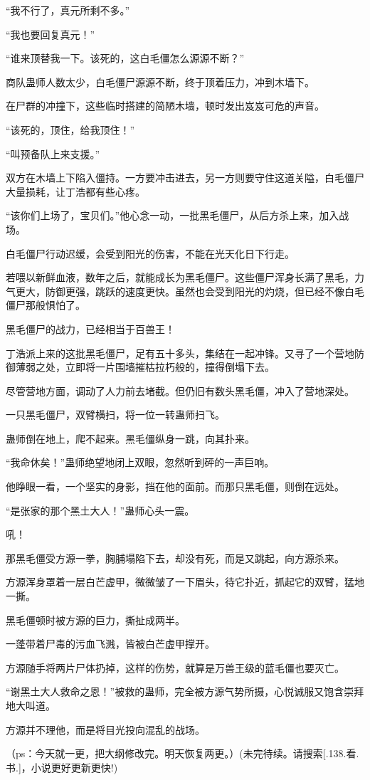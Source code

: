 \begin{this_body}
“我不行了，真元所剩不多。”

“我也要回复真元！”

“谁来顶替我一下。该死的，这白毛僵怎么源源不断？”

商队蛊师人数太少，白毛僵尸源源不断，终于顶着压力，冲到木墙下。

在尸群的冲撞下，这些临时搭建的简陋木墙，顿时发出岌岌可危的声音。

“该死的，顶住，给我顶住！”

“叫预备队上来支援。”

双方在木墙上下陷入僵持。一方要冲击进去，另一方则要守住这道关隘，白毛僵尸大量损耗，让丁浩都有些心疼。

“该你们上场了，宝贝们。”他心念一动，一批黑毛僵尸，从后方杀上来，加入战场。

白毛僵尸行动迟缓，会受到阳光的伤害，不能在光天化日下行走。

若喂以新鲜血液，数年之后，就能成长为黑毛僵尸。这些僵尸浑身长满了黑毛，力气更大，防御更强，跳跃的速度更快。虽然也会受到阳光的灼烧，但已经不像白毛僵尸那般惧怕了。

黑毛僵尸的战力，已经相当于百兽王！

丁浩派上来的这批黑毛僵尸，足有五十多头，集结在一起冲锋。又寻了一个营地防御薄弱之处，立即将一片围墙摧枯拉朽般的，撞得倒塌下去。

尽管营地方面，调动了人力前去堵截。但仍旧有数头黑毛僵，冲入了营地深处。

一只黑毛僵尸，双臂横扫，将一位一转蛊师扫飞。

蛊师倒在地上，爬不起来。黑毛僵纵身一跳，向其扑来。

“我命休矣！”蛊师绝望地闭上双眼，忽然听到砰的一声巨响。

他睁眼一看，一个坚实的身影，挡在他的面前。而那只黑毛僵，则倒在远处。

“是张家的那个黑土大人！”蛊师心头一震。

吼！

那黑毛僵受方源一拳，胸脯塌陷下去，却没有死，而是又跳起，向方源杀来。

方源浑身罩着一层白芒虚甲，微微皱了一下眉头，待它扑近，抓起它的双臂，猛地一撕。

黑毛僵顿时被方源的巨力，撕扯成两半。

一蓬带着尸毒的污血飞溅，皆被白芒虚甲撑开。

方源随手将两片尸体扔掉，这样的伤势，就算是万兽王级的蓝毛僵也要灭亡。

“谢黑土大人救命之恩！”被救的蛊师，完全被方源气势所摄，心悦诚服又饱含崇拜地大叫道。

方源并不理他，而是将目光投向混乱的战场。

（ps：今天就一更，把大纲修改完。明天恢复两更。）(未完待续。请搜索[.138.看.书.]，小说更好更新更快!)

\end{this_body}

